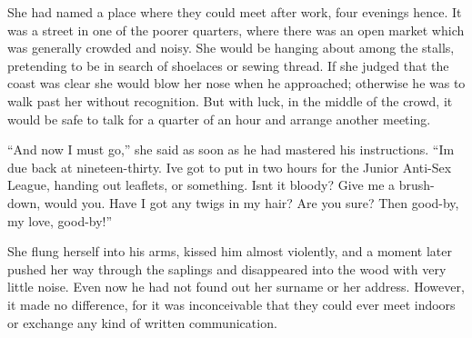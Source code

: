 She had named a place where they could meet after work, four evenings
hence. It was a street in one of the poorer quarters, where there was an
open market which was generally crowded and noisy. She would be hanging
about among the stalls, pretending to be in search of shoelaces or
sewing thread. If she judged that the coast was clear she would blow her
nose when he approached; otherwise he was to walk past her without
recognition. But with luck, in the middle of the crowd, it would be safe
to talk for a quarter of an hour and arrange another meeting.

``And now I must go,'' she said as soon as he had mastered his
instructions. ``I\textquotesingle m due back at nineteen-thirty.
I\textquotesingle ve got to put in two hours for the Junior Anti-Sex
League, handing out leaflets, or something. Isn\textquotesingle t it
bloody? Give me a brush-down, would you. Have I got any twigs in my
hair? Are you sure? Then good-by, my love, good-by!''

She flung herself into his arms, kissed him almost violently, and a
moment later pushed her way through the saplings and disappeared into
the wood with very little noise. Even now he had not found out her
surname or her address. However, it made no difference, for it was
inconceivable that they could ever meet indoors or exchange any kind of
written communication.

